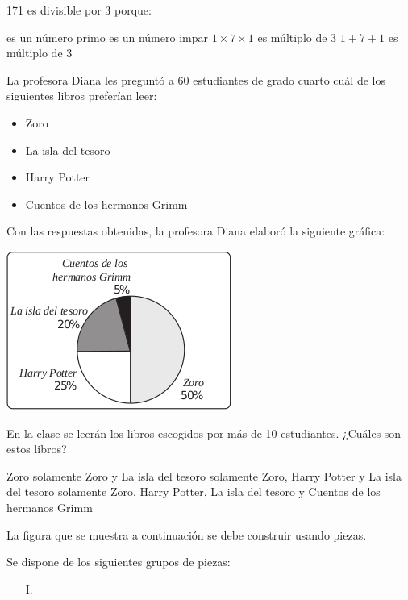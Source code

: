 \documentclass[10pt,addpoints]{exam}
\begin{document}
\begin{multicols}{2}
\begin{questions}
171 es divisible por 3 porque:
\begin{choices}
 es un número primo
 es un número impar
\choice $1 \times 7 \times 1$ es múltiplo de 3
\CorrectChoice $1+7+1$ es múltiplo de 3
\end{choices}
\question La profesora Diana les preguntó a 60 estudiantes de grado cuarto cuál de los siguientes libros preferían leer:
\begin{itemize}
\item Zoro
\item La isla del tesoro
\item Harry Potter
\item Cuentos de los hermanos Grimm
\end{itemize}
Con las respuestas obtenidas, la profesora Diana elaboró la siguiente gráfica:
\begin{center}
\includegraphics[scale=.7]{Images/Pantallazo-23.png} 
\end{center}
En la clase se leerán los libros escogidos por más de 10 estudiantes. ¿Cuáles son estos libros?
\begin{choices}
\choice Zoro solamente
\choice Zoro y La isla del tesoro solamente
\CorrectChoice Zoro, Harry Potter y La isla del tesoro solamente
\choice Zoro, Harry Potter, La isla del tesoro y Cuentos de los hermanos Grimm
\end{choices}
\question La figura que se muestra a continuación se debe construir usando piezas.
\begin{center}
\end{center}
Se dispone de los siguientes grupos de piezas:
\begin{enumerate}
\item[I.] 

\end{enumerate}
\end{questions}
\end{multicols}
\end{document}
